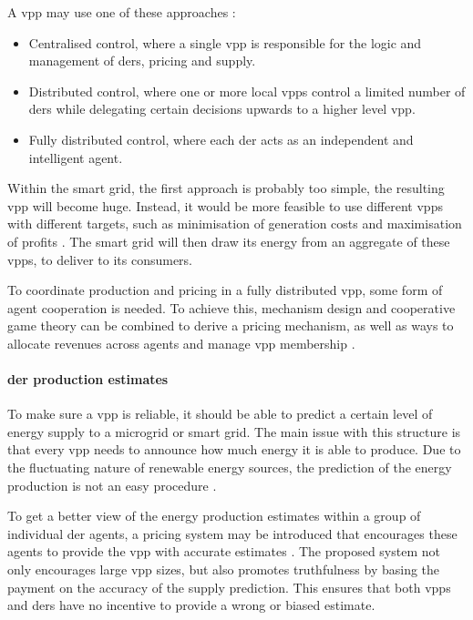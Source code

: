 A \ac{vpp} may use one of these approaches \cite{NikonowiczMilewski2012}:
\begin{itemize}
	\item Centralised control, where a single \ac{vpp} is responsible for the logic and management of \acp{der}, pricing and supply.
	\item Distributed control, where one or more local \acp{vpp} control a limited number of \acp{der} while delegating certain decisions upwards to a higher level \ac{vpp}.
	\item Fully distributed control, where each \ac{der} acts as an independent and intelligent agent.
\end{itemize}

Within the smart grid, the first approach is probably too simple, the resulting \ac{vpp} will become huge. Instead, it would be more feasible to use different \acp{vpp} with different targets, such as minimisation of generation costs and maximisation of profits \cite{LombardiPowalkoRudion2009}. The smart grid will then draw its energy from an aggregate of these \acp{vpp}, to deliver to its consumers. 

To coordinate production and pricing in a fully distributed \ac{vpp}, some form of agent cooperation is needed. To achieve this, mechanism design and cooperative game theory can be combined to derive a pricing mechanism, as well as ways to allocate revenues across agents and manage \ac{vpp} membership \cite{ChalkiadakisRobuKotaEtAl2011}. 

\paragraph{\acl{der} production estimates}
To make sure a \ac{vpp} is reliable, it should be able to predict a certain level of energy supply to a microgrid or smart grid. The main issue with this structure is that every \ac{vpp} needs to announce how much energy it is able to produce. Due to the fluctuating nature of renewable energy sources, the prediction of the energy production is not an easy procedure \cite{LombardiPowalkoRudion2009}.  

To get a better view of the energy production estimates within a group of individual \ac{der} agents, a pricing system may be introduced that encourages these agents to provide the \ac{vpp} with accurate estimates \cite{ChalkiadakisRobuKotaEtAl2011}. The proposed system not only encourages large \ac{vpp} sizes, but also promotes truthfulness by basing the payment on the accuracy of the supply prediction. This ensures that both \acp{vpp} and \acp{der} have no incentive to provide a wrong or biased estimate.

